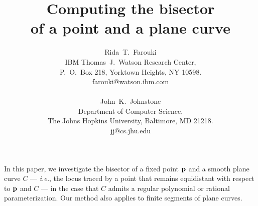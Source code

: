 

\newcommand{\ACMTOG}{{\sl ACM Trans.\ Graph.\ }}
\newcommand{\AMM}{{\sl Amer.\ Math.\ Monthly\ }}
\newcommand{\BIT}{{\sl BIT\ }}
\newcommand{\CACM}{{\sl Commun.\ ACM\ }}
\newcommand{\CAD}{{\sl Comput.\ Aided Design\ }}
\newcommand{\CAGD}{{\sl Comput.\ Aided Geom.\ Design\ }}
\newcommand{\CGIP}{{\sl Comput.\ Graph.\ Image Proc.\ }}
\newcommand{\CJ}{{\sl Computer\ J.\ }}
\newcommand{\DCG}{{\sl Discrete\ Comput.\ Geom.\ }}
\newcommand{\IBMJRD}{{\sl IBM\ J.\ Res.\ Develop.\ }}
\newcommand{\IJCGA}{{\sl Int.\ J.\ Comput.\ Geom.\ Applic.\ }}
\newcommand{\IEEECGA}{{\sl IEEE Comput.\ Graph.\ Applic.\ }}
\newcommand{\IEEETPAMI}{{\sl IEEE Trans.\ Pattern Anal.\ Machine Intell.\ }}
\newcommand{\JACM}{{\sl J.\ Assoc.\ Comput.\ Mach.\ }}
\newcommand{\JAT}{{\sl J.\ Approx.\ Theory\ }}
\newcommand{\MC}{{\sl Math.\ Comp.\ }}
\newcommand{\MI}{{\sl Math.\ Intelligencer\ }}
\newcommand{\NM}{{\sl Numer.\ Math.\ }}
\newcommand{\SIAMJNA}{{\sl SIAM J.\ Numer.\ Anal.\ }}
\newcommand{\SIAMR}{{\sl SIAM Review\ }}

\title{
Computing the bisector \\
of a point and a plane curve
}

\author{
Rida~T.~Farouki \\
IBM Thomas~J.~Watson Research Center, \\
P.~O.~Box 218, Yorktown Heights, NY 10598. \\
farouki@watson.ibm.com \\ \\
John~K.~Johnstone \\
Department of Computer Science, \\
The Johns Hopkins University, Baltimore, MD 21218. \\
jj@cs.jhu.edu
}

\date{}

\maketitle

In this paper, 
we investigate the bisector of a fixed point ${\bf p}$ and a smooth
plane curve $C$ --- {\it i.e.}, the locus traced by a point
that remains equidistant with respect to ${\bf p}$ and $C$ ---
in the case that $C$ admits a regular polynomial or rational parameterization. 
Our method also applies to finite segments of plane curves.


